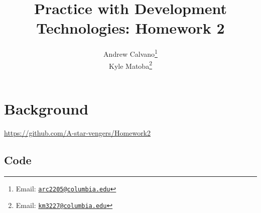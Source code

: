 \documentclass[10pt]{article}
\theoremstyle{remark}
\numberwithin{equation}{section}
\begin{document}
\title{Practice with Development Technologies: Homework 2 }

\author{
Andrew Calvano\thanks{Email: \href{mailto:arc2205@columbia.edu}{\texttt{arc2205@columbia.edu}}} \\ 
Kyle Matoba\thanks{Email: \href{mailto:km3227@columbia.edu}{\texttt{km3227@columbia.edu}}}
}
\date{}
\maketitle



% 

\section{Background} 

\url{https://github.com/A-star-vengers/Homework2} 
\subsection{Code}


\begin{spacing}{0.9}
\printbibliography
\end{spacing}
\end{document}
